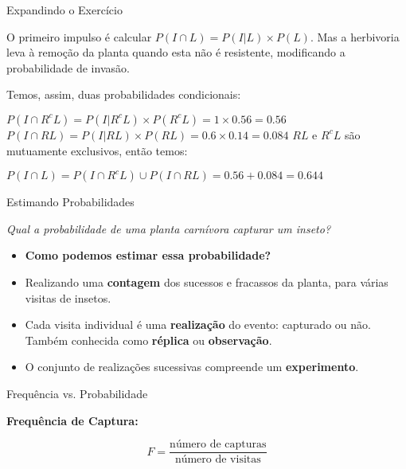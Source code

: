 \documentclass{beamer}\usepackage[]{graphicx}\usepackage[]{color}
\begin{document}
\begin{frame}{Expandindo o Exercício}

\begin{small}

O primeiro impulso é calcular $P(I \cap L) = P(I|L) \times P(L)$. Mas a herbivoria leva à remoção da planta quando esta não é resistente, modificando a probabilidade de invasão.

Temos, assim, duas probabilidades condicionais:

$P(I \cap R^cL) = P(I|R^cL) \times P(R^cL) = 1 \times 0.56 = 0.56$
\vfill
$P(I \cap RL) = P(I|RL) \times P(RL) = 0.6 \times 0.14 = 0.084$
\vfill
$RL$ e $R^cL$ são mutuamente exclusivos, então temos:

$P(I \cap L) = P(I \cap R^cL) \cup P(I \cap RL) = 0.56 + 0.084  = 0.644$


\end{small}

\end{frame}


\begin{frame}{Estimando Probabilidades}

\emph{Qual a probabilidade de uma planta carnívora capturar um inseto?}

\begin{itemize}
  \item \textbf{Como podemos estimar essa probabilidade?} \pause
  \vfill
  \item Realizando uma \textbf{contagem} dos sucessos e fracassos da planta, para várias visitas de insetos.\pause
  \vfill
  \item Cada visita individual é uma \textbf{realização} do evento: capturado ou não. Também conhecida como \textbf{réplica} ou \textbf{observação}.\pause
  \vfill
  \item O conjunto de realizações sucessivas compreende um \textbf{experimento}.
\end{itemize}

\end{frame} 


\begin{frame}{Frequência vs. Probabilidade}

\begin{centering}

\textbf{Frequência de Captura:}

\begin{equation*}
    F  = \frac{\text{número de capturas}}{\text{número de visitas}}
\end{equation*}


\end{centering}

\end{frame} 
\end{document}
